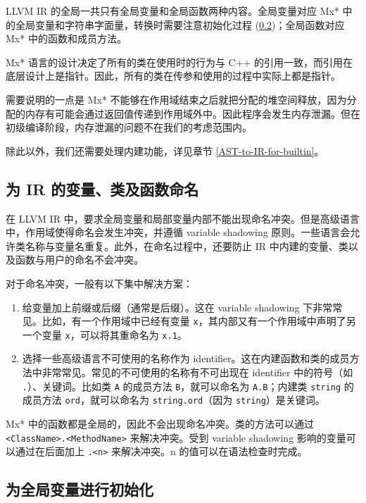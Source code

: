 LLVM IR 的全局一共只有全局变量和全局函数两种内容。全局变量对应 Mx*
中的全局变量和字符串字面量，转换时需要注意初始化过程
(\ref{AST-to-IR-initializing})；全局函数对应 Mx* 中的函数和成员方法。

Mx* 语言的设计决定了所有的类在使用时的行为与 C++
的引用一致，而引用在底层设计上是指针。因此，所有的类在传参和使用的过程中实际上都是指针。

需要说明的一点是 Mx* 不能够在作用域结束之后就把分配的堆空间释放，因为分配的内存有可能会通过返回值传递到作用域外中。因此程序会发生内存泄漏。但在初级编译阶段，内存泄漏的问题不在我们的考虑范围内。

除此以外，我们还需要处理内建功能，详见章节
\ref{AST-to-IR-for-builtin}。

\subsection{为 IR 的变量、类及函数命名}\label{AST-to-IR-naming}

在 LLVM IR 中，要求全局变量和局部变量内部不能出现命名冲突。但是高级语言中，作用域使得命名会发生冲突，并遵循
variable shadowing 原则。一些语言会允许类名称与变量名重复。此外，在命名过程中，还要防止
IR 中内建的变量、类以及函数与用户的命名不会冲突。

对于命名冲突，一般有以下集中解决方案：
\begin{enumerate}
 \item 给变量加上前缀或后缀（通常是后缀）。这在 variable shadowing 下非常常见。比如，有一个作用域中已经有变量
   \texttt x，其内部又有一个作用域中声明了另一个变量 \texttt x，可以将其重命名为
   \texttt{x.1}。
 \item 选择一些高级语言不可使用的名称作为 identifier。这在内建函数和类的成员方法中非常常见。常见的不可使用的名称有不可出现在
   identifier 中的符号（如 \texttt{.}）、关键词。比如类 \texttt A 的成员方法
   \texttt{B}，就可以命名为 \texttt{A.B}；内建类 \texttt{string} 的成员方法
   \texttt{ord}，就可以命名为 \texttt{string.ord}（因为 \texttt{string}）是关键词。
\end{enumerate}

Mx* 中的函数都是全局的，因此不会出现命名冲突。类的方法可以通过
\texttt{<ClassName>.<MethodName>} 来解决冲突。受到 variable shadowing
影响的变量可以通过在后面加上 \texttt{.<n>} 来解决冲突。n 的值可以在语法检查时完成。

\subsection{为全局变量进行初始化}\label{AST-to-IR-initializing}

